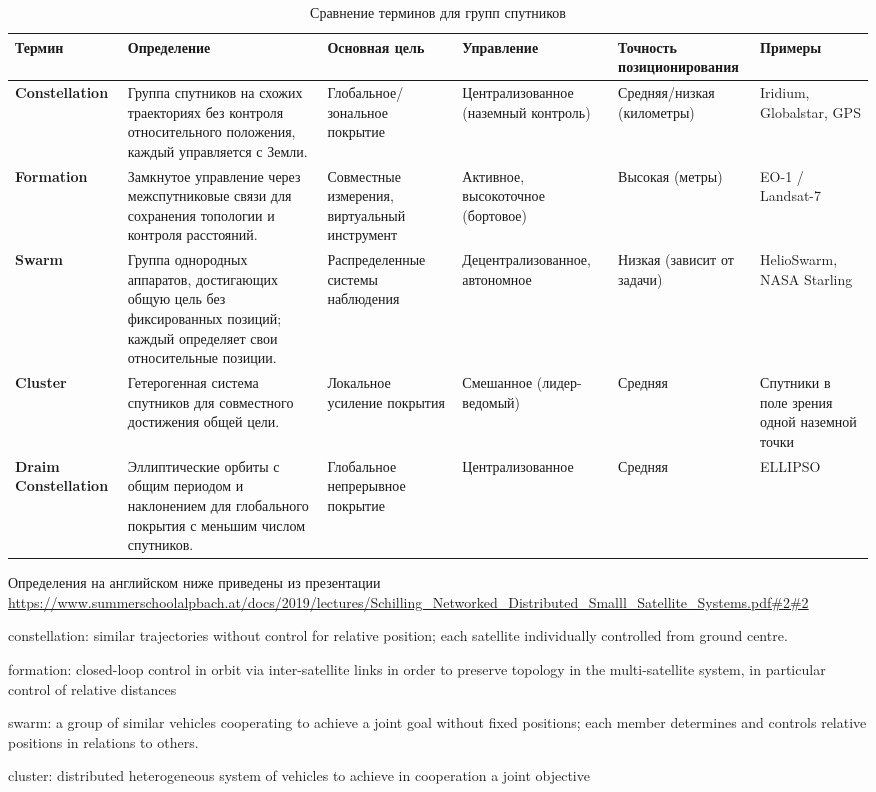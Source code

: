 \begin{table}[htbp]
\centering
\caption{Сравнение терминов для групп спутников}
\label{tab:satellite_groups}
\begin{tabular}{|p{2.4cm}|p{3.0cm}|p{3.0cm}|p{2.8cm}|p{2.8cm}|p{3.0cm}|}
\hline
\textbf{Термин} & \textbf{Определение} & \textbf{Основная цель} & \textbf{Управление} & \textbf{Точность позиционирования} & \textbf{Примеры} \\
\hline
\textbf{Constellation} & Группа спутников на схожих траекториях без контроля относительного положения, каждый управляется с Земли. & Глобальное/зональное покрытие & Централизованное (наземный контроль) & Средняя/низкая (километры) & Iridium, Globalstar, GPS \\
\hline
\textbf{Formation} & Замкнутое управление через межспутниковые связи для сохранения топологии и контроля расстояний. & Совместные измерения, виртуальный инструмент & Активное, высокоточное (бортовое) & Высокая (метры) & EO-1 / Landsat-7 \\
\hline
\textbf{Swarm} & Группа однородных аппаратов, достигающих общую цель без фиксированных позиций; каждый определяет свои относительные позиции. & Распределенные системы наблюдения & Децентрализованное, автономное & Низкая (зависит от задачи) & HelioSwarm, NASA Starling \\
\hline
\textbf{Cluster} & Гетерогенная система спутников для совместного достижения общей цели. & Локальное усиление покрытия & Смешанное (лидер-ведомый) & Средняя & Спутники в поле зрения одной наземной точки \\
\hline
\textbf{Draim Constellation} & Эллиптические орбиты с общим периодом и наклонением для глобального покрытия с меньшим числом спутников. & Глобальное непрерывное покрытие & Централизованное & Средняя & ELLIPSO \\
\hline
\end{tabular}
\end{table}


Определения на английском ниже приведены из презентации 
\url{https://www.summerschoolalpbach.at/docs/2019/lectures/Schilling_Networked_Distributed_Smalll_Satellite_Systems.pdf#2#2}

constellation: similar trajectories without control for relative
position; each satellite individually controlled from ground centre.

formation: closed-loop control in orbit via inter-satellite links in
order to preserve topology in the multi-satellite system, in
particular control of relative distances

swarm: a group of similar vehicles cooperating to achieve a joint
goal without fixed positions; each member determines and
controls relative positions in relations to others.

cluster: distributed heterogeneous system of vehicles to achieve
in cooperation a joint objective
